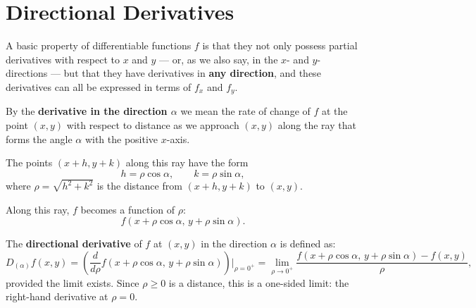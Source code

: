 \documentclass[11pt]{report}
\begin{document}
\section{Directional Derivatives}

A basic property of differentiable functions $f$ is that they not only possess partial derivatives with respect to $x$ and $y$ — or, as we also say, in the $x$- and $y$-directions — but that they have derivatives in \textbf{any direction}, and these derivatives can all be expressed in terms of $f_x$ and $f_y$.

\begin{definition}
By the \textbf{derivative in the direction $\alpha$} we mean the rate of change of $f$ at the point $(x, y)$ with respect to distance as we approach $(x, y)$ along the ray that forms the angle $\alpha$ with the positive $x$-axis.

The points $(x + h, y + k)$ along this ray have the form
\[
h = \rho \cos \alpha, \qquad k = \rho \sin \alpha,
\]
where $\rho = \sqrt{h^2 + k^2}$ is the distance from $(x + h, y + k)$ to $(x, y)$.

Along this ray, $f$ becomes a function of $\rho$:
\[
f(x + \rho \cos \alpha, \, y + \rho \sin \alpha).
\]

The \textbf{directional derivative} of $f$ at $(x, y)$ in the direction $\alpha$ is defined as:
\[
D_{(\alpha)} f(x, y) = \left( \frac{d}{d\rho} f(x + \rho \cos \alpha, \, y + \rho \sin \alpha) \right)\bigg|_{\rho = 0^+} = \lim_{\rho \to 0^+} \frac{f(x + \rho \cos \alpha, \, y + \rho \sin \alpha) - f(x, y)}{\rho},
\]
provided the limit exists. Since $\rho \ge 0$ is a distance, this is a one-sided limit: the right-hand derivative at $\rho = 0$.
\end{definition}
\end{document}
